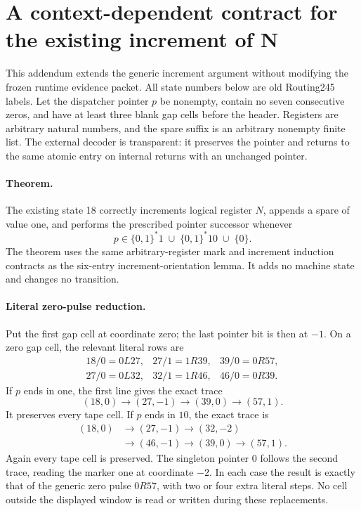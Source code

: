\section{A context-dependent contract for the existing increment of N}
\label{sec:state18-context}

This addendum extends the generic increment argument without modifying the
frozen runtime evidence packet. All state numbers below are old Routing245
labels. Let the dispatcher pointer $p$ be nonempty, contain no seven
consecutive zeros, and have at least three blank gap cells before the header.
Registers are arbitrary natural numbers, and the spare suffix is an arbitrary
nonempty finite list. The external decoder is transparent: it preserves the
pointer and returns to the same atomic entry on internal returns with an
unchanged pointer.

\paragraph{Theorem.}
The existing state 18 correctly increments logical register $N$, appends a
spare of value one, and performs the prescribed pointer successor whenever
\[
p\in\{0,1\}^{*}1\;\cup\;\{0,1\}^{*}10\;\cup\;\{0\}.
\]
The theorem uses the same arbitrary-register mark and increment induction
contracts as the six-entry increment-orientation lemma. It adds no machine
state and changes no transition.

\paragraph{Literal zero-pulse reduction.}
Put the first gap cell at coordinate zero; the last pointer bit is then at
$-1$. On a zero gap cell, the relevant literal rows are
\[
\begin{array}{lll}
18/0=0L27,&27/1=1R39,&39/0=0R57,\\
27/0=0L32,&32/1=1R46,&46/0=0R39.
\end{array}
\]
If $p$ ends in one, the first line gives the exact trace
\[
(18,0)\longrightarrow(27,-1)\longrightarrow(39,0)
       \longrightarrow(57,1).
\]
It preserves every tape cell. If $p$ ends in $10$, the exact trace is
\[
\begin{split}
(18,0)&\longrightarrow(27,-1)\longrightarrow(32,-2)\\
&\longrightarrow(46,-1)\longrightarrow(39,0)
 \longrightarrow(57,1).
\end{split}
\]
Again every tape cell is preserved. The singleton pointer $0$ follows the
second trace, reading the marker one at coordinate $-2$. In each case the
result is exactly that of the generic zero pulse $0R57$, with two or four
extra literal steps. No cell outside the displayed window is read or
written during these replacements.

